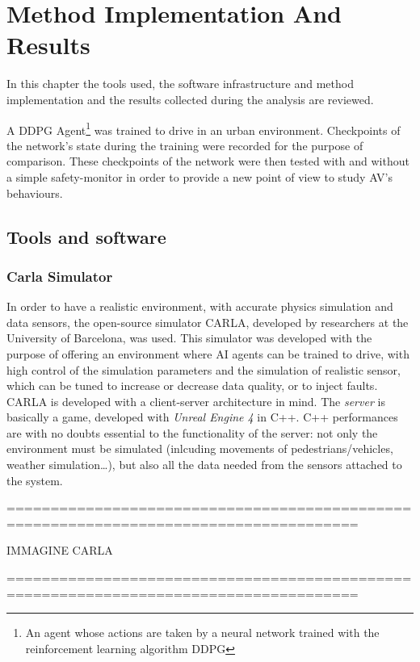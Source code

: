 \chapter{Method Implementation And Results}

In this chapter the tools used, the software infrastructure and method implementation and the results collected during the analysis are reviewed.

A DDPG Agent\footnote{An agent whose actions are taken by a neural network trained with the reinforcement learning algorithm DDPG} was trained to drive in an urban environment. Checkpoints of the network's state during the training were recorded for the purpose of comparison. These checkpoints of the network were then tested with and without a simple safety-monitor in order to provide a new point of view to study AV's behaviours.

\section{Tools and software}

\subsection{Carla Simulator}

In order to have a realistic environment, with accurate physics simulation and data sensors, the open-source simulator CARLA\cite{carla}, developed by researchers at the University of Barcelona, was used. This simulator was developed with the purpose of offering an environment where AI agents can be trained to drive, with high control of the simulation parameters and the simulation of realistic sensor, which can be tuned to increase or decrease data quality, or to inject faults.\newline
CARLA is developed with a client-server architecture in mind. The \textsl{server} is basically a game, developed with \textsl{Unreal Engine 4} in C++. C++ performances are with no doubts essential to the functionality of the server: not only the environment must be simulated (inlcuding movements of pedestrians/vehicles, weather simulation\dots), but also all the data needed from the sensors attached to the system.\newline


======================================================================================

IMMAGINE CARLA

======================================================================================

